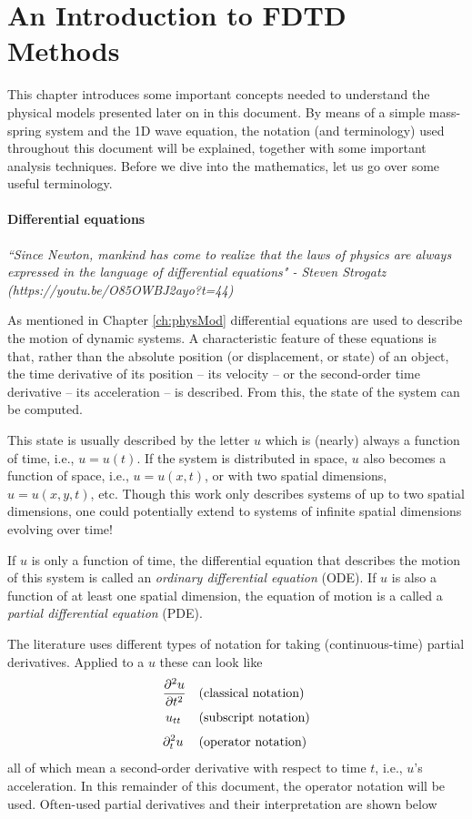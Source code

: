 \chapter{An Introduction to FDTD Methods}
This chapter introduces some important concepts needed to understand the physical models presented later on in this document. 
By means of a simple mass-spring system and the 1D wave equation, the notation (and terminology) used throughout this document will be explained, together with some important analysis techniques. 
Before we dive into the mathematics, let us go over some useful terminology.

\subsubsection{Differential equations}
{\it ``Since Newton, mankind has come to realize that the laws of physics are always expressed in the language of differential equations" - Steven Strogatz \\
(https://youtu.be/O85OWBJ2ayo?t=44)}

As mentioned in Chapter \ref{ch:physMod} differential equations are used to describe the motion of dynamic systems. A characteristic feature of these equations is that, rather than the absolute position (or displacement, or state) of an object, the time derivative of its position -- its velocity -- or the second-order time derivative -- its acceleration -- is described. From this, the state of the system can be computed.

This state is usually described by the letter $u$ which is (nearly) always a function of time, i.e., $u=u(t)$. If the system is distributed in space, $u$ also becomes a function of space, i.e., $u = u(x,t)$, or with two spatial dimensions, $u = u(x,y,t)$, etc. Though this work only describes systems of up to two spatial dimensions, one could potentially extend to systems of infinite spatial dimensions evolving over time! 

If $u$ is only a function of time, the differential equation that describes the motion of this system is called an \textit{ordinary differential equation} (ODE). If $u$ is also a function of at least one spatial dimension, the equation of motion is a called a \textit{partial differential equation} (PDE).

The literature uses different types of notation for taking (continuous-time) partial derivatives. Applied to a  $u$ these can look like 
%
\begin{equation}\nonumber
    \begin{aligned}
        \frac{\partial^2 u}{\partial t^2} & \quad \text{(classical notation)}\\
        u_{tt}\:\,& \quad \text{(subscript notation)}\\[3pt]
        \partial_t^2 u\: & \quad \text{(operator notation)}
    \end{aligned}
\end{equation}
%
all of which mean a second-order derivative with respect to time $t$, i.e., $u$'s acceleration. In this remainder of this document, the operator notation will be used. Often-used partial derivatives and their interpretation  are shown below

